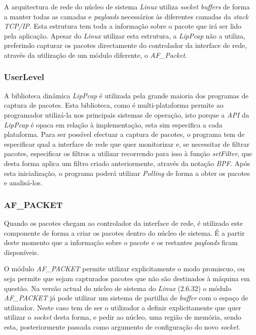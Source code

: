 A arquitectura de rede do núcleo de sistema \textit{Linux} utiliza \textit{socket buffers} de forma a manter todas as camadas e \textit{payloads} necessários às diferentes camadas da \textit{stack TCP/IP}. Esta estrutura tem toda a informação sobre o pacote que irá ser lido pela aplicação. Apesar do \textit{Linux} utilizar esta estrutura, a \textit{LipPcap} não a utiliza, preferindo capturar os pacotes directamente do controlador da interface de rede, através da utilização de um módulo diferente, o \textit{AF\_Packet}.

\subsubsection{UserLevel}

A biblioteca dinâmica \textit{LipPcap} é utilizada pela grande maioria dos programas de captura de pacotes. Esta biblioteca, como é multi-plataforma permite ao programador utilizá-la nos principais sistemas de operação, isto porque a \textit{API} da \textit{LipPcap} é opaca em relação à implementação, esta sim especifica a cada plataforma. 
Para ser possível efectuar a captura de pacotes, o programa tem de especificar qual a interface de rede que quer monitorizar e, se necessitar de filtrar pacotes, especificar os filtros a utilizar recorrendo para isso à função \textit{setFilter}, que desta forma aplica um filtro criado anteriormente, através da notação \textit{BPF}. Após esta inicialização, o programa poderá utilizar \textit{Polling} de forma a obter os pacotes e analisá-los.

\subsubsection{AF\_PACKET}

Quando os pacotes chegam ao controlador da interface de rede, é utilizado este componente de forma a criar os pacotes dentro do núcleo de sistema. 
 É a partir deste momento que a informação sobre o pacote e os restantes \textit{payloads} ficam disponíveis.

O módulo \textit{AF\_PACKET} permite utilizar explicitamente o modo promiscuo, ou seja permite que sejam capturados pacotes que não são destinados à máquina em questão.
Na versão actual do núcleo de sistema do \textit{Linux} (2.6.32) o módulo \textit{AF\_PACKET} já pode utilizar um sistema de partilha de \textit{buffer} com o espaço de utilizador.
 Neste caso tem de ser o utilizador a definir explicitamente que quer utilizar o \textit{socket} desta forma, e pedir ao núcleo, uma região de memória, sendo esta, posteriormente passada como argumento de configuração do novo \textit{socket}.

